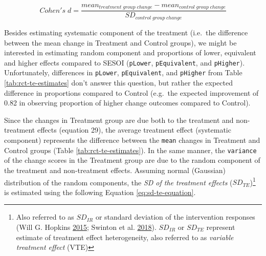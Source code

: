 \documentclass[
]{book}
\begin{document}
\begin{equation}
Cohen's\;d = \frac{mean_{treatment\; group \; change} - mean_{control\; group \;change}}{SD_{control\; group \; change}}
\label{eq:te-nte-cohen}
\end{equation}

Besides estimating systematic component of the treatment (i.e.~the difference between the mean change in Treatment and Control groups), we might be interested in estimating random component and proportions of lower, equivalent and higher effects compared to SESOI (\texttt{pLower}, \texttt{pEquivalent}, and \texttt{pHigher}). Unfortunately, differences in \texttt{pLower}, \texttt{pEquivalent}, and \texttt{pHigher} from Table \ref{tab:rct-te-estimates} don't answer this question, but rather the expected difference in proportions compared to Control (e.g.~the expected improvement of 0.82 in observing proportion of higher change outcomes compared to Control).

Since the changes in Treatment group are due both to the treatment and non-treatment effects (equation 29), the average treatment effect (systematic component) represents the difference between the \texttt{mean} changes in Treatment and Control groups (Table \ref{tab:rct-te-estimates}). In the same manner, the \texttt{variance} of the change scores in the Treatment group are due to the random component of the treatment and non-treatment effects. Assuming normal (Gaussian) distribution of the random components, the \emph{SD of the treatment effects} (\(SD_{TE}\))\footnote{Also referred to as \(SD_{IR}\) or standard deviation of the intervention responses (Will G. Hopkins \protect\hyperlink{ref-hopkinsIndividualResponsesMade2015}{2015}; Swinton et al. \protect\hyperlink{ref-swintonStatisticalFrameworkInterpret2018}{2018}). \(SD_{IR}\) or \(SD_{TE}\) represent estimate of treatment effect heterogeneity, also referred to as \emph{variable treatment effect} (VTE)} is estimated using the following Equation \eqref{eq:sd-te-equation}.
\end{document}
